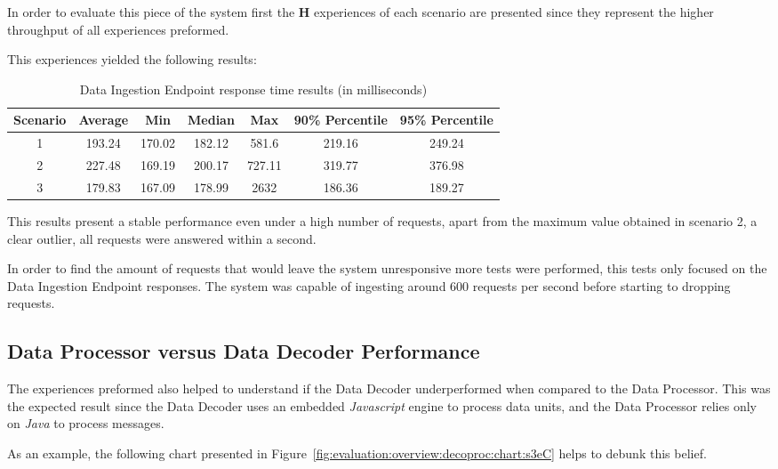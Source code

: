 In order to evaluate this piece of the system first the \textbf{H} experiences of each scenario are presented since they represent the higher throughput of all experiences preformed.

This experiences yielded the following results:

\begin{table}[H]
    \centering
    \begin{tabular}{@{}ccccccc@{}}
    \toprule
    \textbf{Scenario} & \textbf{Average} & \textbf{Min} & \textbf{Median} & \textbf{Max} & \textbf{90\% Percentile} & \textbf{95\% Percentile} \\ \midrule
    1 & 193.24 & 170.02 & 182.12 & 581.6 & 219.16 & 249.24 \\ \midrule
    2 & 227.48 & 169.19 & 200.17 & 727.11 & 319.77 & 376.98 \\ \midrule
    3 & 179.83 & 167.09 & 178.99 & 2632 & 186.36 & 189.27 \\ \bottomrule
    \end{tabular}
    \caption{Data Ingestion Endpoint response time results (in milliseconds)}
    \label{tab:evaluation:overview:endpoint:results}
\end{table}

This results present a stable performance even under a high number of requests, apart from the maximum value obtained in scenario 2, a clear outlier, all requests were answered within a second.

In order to find the amount of requests that would leave the system unresponsive more tests were performed, this tests only focused on the Data Ingestion Endpoint responses. The system was capable of ingesting around 600 requests per second before starting to dropping requests.

\subsection{Data Processor versus Data Decoder Performance}
\label{subsec:evaluation:overview:decoproc}

The experiences preformed also helped to understand if the Data Decoder  underperformed when compared to the Data Processor. This was the expected result since the Data Decoder uses an embedded \textit{Javascript} engine to process data units, and the Data Processor relies only on \textit{Java} to process messages.

As an example, the following chart presented in Figure~\ref{fig:evaluation:overview:decoproc:chart:s3eC} helps to debunk this belief.

